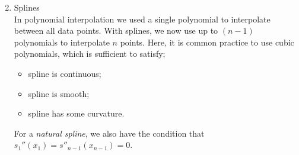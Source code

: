 \documentclass[11pt,a4paper]{report}
\begin{document}
		\begin{enumerate}
			\setcounter{enumi}{1}
			\item Splines \\
				In polynomial interpolation we used a single polynomial to interpolate between all data points. With splines, we now use up to $(n-1)$ polynomials to interpolate $n$ points. Here, it is common practice to use cubic polynomials, which is sufficient to satisfy;
				\begin{itemize}
					\item spline is continuous;
					\item spline is smooth;
					\item spline has some curvature.
				\end{itemize}
			For a \textit{natural spline}, we also have the condition that $s_1''(x_1)=s''_{n-1}(x_{n-1})=0$. \\
			

\end{enumerate}
\end{document}
